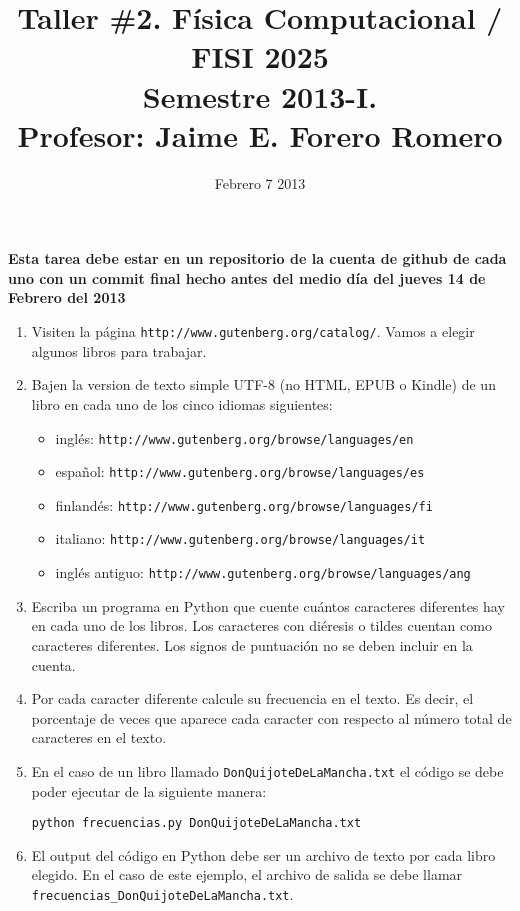 \documentclass{article}
\title{Taller \#2. F\'isica Computacional / FISI 2025 \\Semestre 2013-I. \\ Profesor: Jaime E. Forero Romero}
\date{Febrero 7 2013}
\begin{document}
\maketitle

{\bf Esta tarea debe estar en un repositorio de la cuenta de github de
  cada uno con un commit final hecho antes del medio d\'ia del jueves
  14 de Febrero del 2013} 

\begin{enumerate}
\item
Visiten la p\'agina \verb"http://www.gutenberg.org/catalog/". Vamos a
elegir algunos libros para trabajar. 

\item
Bajen la version de texto simple UTF-8 (no HTML, EPUB o Kindle) de un
libro en cada uno de los cinco idiomas siguientes:  
\begin{itemize}
\item ingl\'es: \verb"http://www.gutenberg.org/browse/languages/en"
\item espa\~nol: \verb"http://www.gutenberg.org/browse/languages/es"
\item finland\'es: \verb"http://www.gutenberg.org/browse/languages/fi"
\item italiano: \verb"http://www.gutenberg.org/browse/languages/it"
\item ingl\'es antiguo: \verb"http://www.gutenberg.org/browse/languages/ang"
\end{itemize}

\item
Escriba un programa en Python que cuente cu\'antos caracteres
diferentes hay en cada uno de los libros. Los caracteres con
di\'eresis o tildes cuentan como caracteres diferentes. Los signos de
puntuaci\'on no se deben incluir en la cuenta. 

\item 
Por cada caracter diferente calcule su frecuencia en el texto. Es decir, el
porcentaje de veces que aparece cada caracter con respecto
al n\'umero total de caracteres en el texto. 

\item 
En el caso de un libro llamado \verb"DonQuijoteDeLaMancha.txt"
el c\'odigo se debe poder ejecutar de la siguiente manera: 
\begin{verbatim}
python frecuencias.py DonQuijoteDeLaMancha.txt
\end{verbatim}

\item
El output del c\'odigo en Python debe ser un archivo de texto por cada
libro elegido. En el caso de este ejemplo, el archivo de salida se
debe llamar \verb"frecuencias_DonQuijoteDeLaMancha.txt".  


\end{enumerate}
\end{document}
